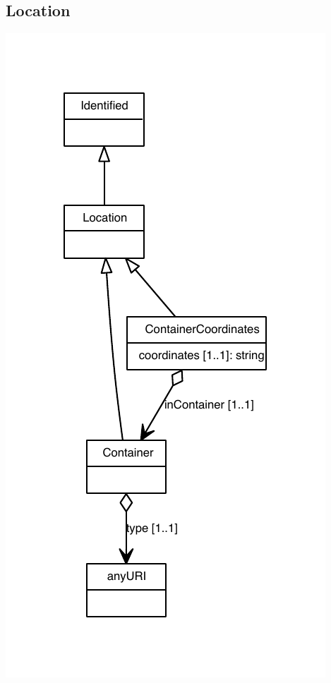 \subsection{Location}
\label{sec:Location}


\begin{center}
\includegraphics[scale=0.8]{uml/Location_abstraction_hierarchy.pdf}
\end{center}


